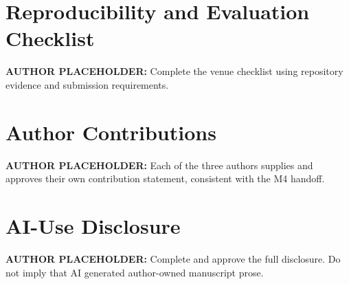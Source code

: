 \documentclass{article}
\begin{document}
\appendix
\section{Reproducibility and Evaluation Checklist}
\textbf{AUTHOR PLACEHOLDER:} Complete the venue checklist using repository evidence and submission requirements.

\section{Author Contributions}
\textbf{AUTHOR PLACEHOLDER:} Each of the three authors supplies and approves their own contribution statement, consistent with the M4 handoff.

\section{AI-Use Disclosure}
\textbf{AUTHOR PLACEHOLDER:} Complete and approve the full disclosure. Do not imply that AI generated author-owned manuscript prose.
\end{document}
